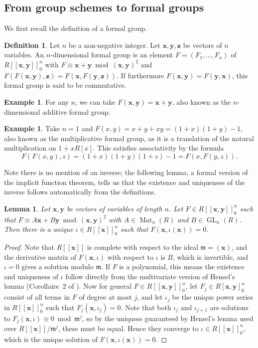 \documentclass[12pt]{article}
\newcommand{\vx}{\mathbf{x}}
\newcommand{\vy}{\mathbf{y}}
\newcommand{\vz}{\mathbf{z}}
\newcommand{\m}{\mathfrak{m}}
\DeclareMathOperator{\GL}{GL}
\DeclareMathOperator{\Mat}{Mat}
\theoremstyle{plain}
\newtheorem{lem}[thm]{Lemma} %
\theoremstyle{definition}
\newtheorem{defn}[thm]{Definition} %
\newtheorem{exmp}[thm]{Example} %
\theoremstyle{remark}
\begin{document}
\subsection{From group schemes to formal groups}
We first recall the definition of a formal group.
\begin{defn}
\label{defn:formalgroup}
Let $n$ be a non-negative integer. Let $\vx,\vy,\vz$ be vectors of $n$ variables. An $n$-dimensional formal group is an element $F = (F_1,\dots,F_n)$ of $R[[\vx,\vy]]_0^n$ with $F \equiv \vx + \vy \bmod (\vx,\vy)^2$ and $F(F(\vx,\vy),\vz) = F(\vx,F(\vy,\vz))$. If furthermore $F(\vx,\vy) = F(\vy,\vx)$, this formal group is said to be commutative.
\end{defn}
\begin{exmp}
\label{exmp:ganformalgroup}
For any $n$, we can take $F(\vx,\vy) = \vx+ \vy$, also known as the $n$-dimensional additive formal group.
\end{exmp}
\begin{exmp}
\label{exmp:gmformalgroup}
Take $n=1$ and $F(x,y) = x + y + xy = (1+x)(1+y)-1$, also known as the multiplicative formal group, as it is a translation of the natural multiplication on $1 + xR[x]$. This satisfies associativity by the formula \[F(F(x,y),z) = (1+x)(1+y)(1+z)-1 = F(x,F(y,z)).\]
\end{exmp}
Note there is no mention of an inverse; the following lemma, a formal version of the implicit function theorem, tells us that the existence and uniqueness of the inverse follows automatically from the definitions.
\begin{lem}
\label{lem:implicitfunction}
Let $\vx,\vy$ be vectors of variables of length $n$. Let $F \in R[[\vx,\vy]]_0^n$ such that $F \equiv A\vx + B\vy \bmod (\vx,\vy)^2$ with $A \in \Mat_n(R)$ and $B \in \GL_n(R)$. Then there is a unique $\iota \in R[[\vx]]_0^n$ such that $F(\vx,\iota(\vx)) = 0$. 
\end{lem}
\begin{proof}
Note that $R[[\vx]]$ is complete with respect to the ideal $\m = (\vx)$, and the derivative matrix of $F(\vx,\iota)$ with respect to $\iota$ is $B$, which is invertible, and $\iota = 0$ gives a solution modulo $\m$. If $F$ is a polynomial, this means the existence and uniqueness of $\iota$ follow directly from the multivariate version of Hensel's lemma (Corollaire~2 of \cite[III,4.5]{BourbakiCA}).  Now for general $F \in R[[\vx,\vy]]_0^n$, let $F_j \in R[\vx,\vy]_0^n$ consist of all terms in $F$ of degree at most $j$, and let $\iota_j$ be the unique power series in $R[[\vx]]_0^n$ such that $F_j(\vx,\iota_j) = 0$. Note that both $\iota_j$ and $\iota_{j+1}$ are solutions to $F_j(\vx,\iota) \equiv 0 \bmod \m^j$, so by the uniquess guaranteed by Hensel's lemma used over $R[[\vx]]/\m^j$, these must be equal. Hence they converge to $\iota \in R[[\vx]]_0^n$, which is the unique solution of $F(\vx,\iota(\vx)) = 0$.
\end{proof}
\end{document}
